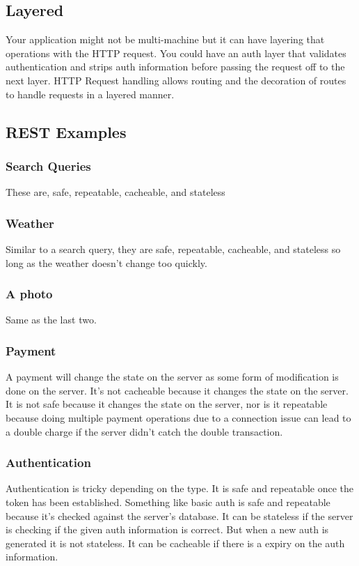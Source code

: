 \documentclass[../CMPUT-404-Notes.tex]{subfiles}
\begin{document}
\subsection{Layered}
Your application might not be multi-machine but it can have layering that operations with the HTTP request.
You could have an auth layer that validates authentication and strips auth information before passing the request off to the next layer.
HTTP Request handling allows routing and the decoration of routes to handle requests in a layered manner.

\subsection{REST Examples}
\subsubsection{Search Queries}
These are, safe, repeatable, cacheable, and stateless
\subsubsection{Weather}
Similar to a search query, they are safe, repeatable, cacheable, and stateless so long as the weather doesn't change too quickly.
\subsubsection{A photo}
Same as the last two.
\subsubsection{Payment}
A payment will change the state on the server as some form of modification is done on the server.
It's not cacheable because it changes the state on the server. It is not safe because it changes the state on the server, nor is it repeatable because doing multiple payment operations due to a connection issue can lead to a double charge if the server didn't catch the double transaction.
\subsubsection{Authentication}
Authentication is tricky depending on the type.
It is safe and repeatable once the token has been established. Something like basic auth is safe and repeatable because it's checked against the server's database. It can be stateless if the server is checking if the given auth information is correct. But when a new auth is generated it is not stateless. It can be cacheable if there is a expiry on the auth information.
\end{document}
